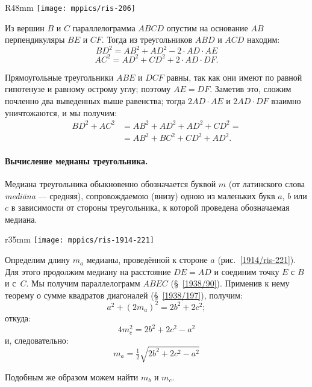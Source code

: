 \begin{wrapfigure}{R}{48mm}
\centering
\texttt{[image: mppics/ris-206]}
\caption{}\label{1938/ris-206}
\end{wrapfigure}

Из вершин $B$ и $C$ параллелограмма $ABCD$ опустим на основание $AB$ перпендикуляры $BE$ и $CF$.
Тогда из треугольников $ABD$ и $ACD$ находим:
\[BD^2=AB^2+AD^2-2\cdot AD\cdot AE\]
\[AC^2=AD^2+CD^2+2\cdot AD\cdot  DF.\]

Прямоугольные треугольники $ABE$ и $DCF$ равны, так как они имеют по равной гипотенузе и равному острому углу;
поэтому $AE=DF$.
Заметив это, сложим почленно два выведенных выше равенства;
тогда $2AD\cdot  AE$ и $2AD\cdot  DF$ взаимно уничтожаются, и мы получим:
\begin{align*}
BD^2+AC^2&=AB^2+AD^2+AD^2+CD^2=
\\
&=AB^2+BC^2+CD^2+AD^2.
\end{align*}

\paragraph{Вычисление медианы треугольника.}\label{1914/241}
Медиана треугольника обыкновенно обозначается буквой $m$ (от латинского слова \emph{mediāna} --- средняя), сопровождаемою (внизу) одною из маленьких букв $a$, $b$ или $c$ в зависимости от стороны треугольника, к которой проведена обозначаемая медиана.

\begin{wrapfigure}{r}{35mm}
\centering
\texttt{[image: mppics/ris-1914-221]}
\caption{}\label{1914/ris-221}
\end{wrapfigure}

Определим длину $m_a$ медианы, проведённой к стороне $a$ (рис.~\ref{1914/ris-221}).
Для этого продолжим медиану на расстояние $DE=AD$ и соединим точку $E$ с $B$ и с~$C$.
Мы получим параллелограмм $ABEC$ (§~\ref{1938/90}).
Применив к нему теорему о сумме квадратов диагоналей (§~\ref{1938/197}), получим:
\[a^2+(2m_a)^2=2b^2+2c^2;\]
откуда: 
\[4m_c^2=2b^2+2c^2-a^2\]
и, следовательно:
\[m_a=\tfrac 12\sqrt{2b^2+2c^2-a^2}\]

Подобным же образом можем найти $m_b$ и $m_c$.

